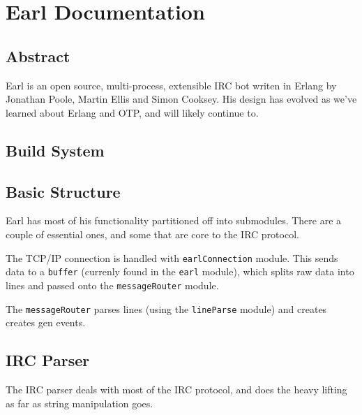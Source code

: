 \documentclass[12pt]{article}
\begin{document}
\section*{Earl Documentation}

\subsection*{Abstract}

Earl is an open source, multi-process, extensible IRC bot writen in Erlang by
Jonathan Poole, Martin Ellis and Simon Cooksey.  His design has evolved as we've
learned about Erlang and OTP, and will likely continue to.

\subsection*{Build System}

\subsection*{Basic Structure}

Earl has most of his functionality partitioned off into submodules. There are a
couple of essential ones, and some that are core to the IRC protocol.

The TCP/IP connection is handled with \texttt{earlConnection} module. This sends
data to a \texttt{buffer} (currenly found in the \texttt{earl} module), which
splits raw data into lines and passed onto the \texttt{messageRouter} module.

The \texttt{messageRouter} parses lines (using the \texttt{lineParse} module)
and creates creates gen events.

\subsection*{IRC Parser}

The IRC parser deals with most of the IRC protocol, and does the heavy lifting
as far as string manipulation goes.
\end{document}

